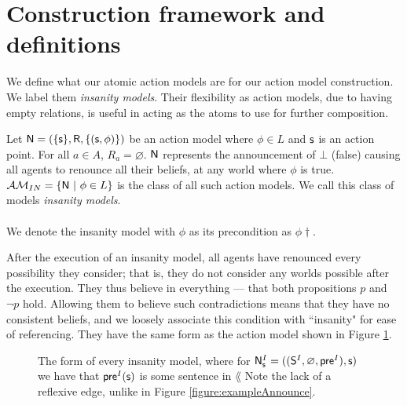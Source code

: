 \section{Construction framework and definitions} \label{subsec:Multi:techPrelim}

We define what our atomic action models are for our action model construction.
We label them {\em insanity models}.
Their flexibility as action models, due to having empty relations, is useful in acting as the atoms to
use for further composition.

\begin{defn} \label{insanity}
Let $\mathrm{\mathsf{\mathrm{\mathsf{N}} = (\{ s \}, R, \{(s, \phi)\})}}$ be an action model
where $\phi \in L$ and $\mathrm{\mathsf{s}}$ is an action point.
For all $a \in A$, $R_a = \varnothing$.
$\mathrm{\mathsf{\mathrm{\mathsf{N}}}}$ represents the announcement of $\bot$ (false) causing all agents to renounce all
their beliefs, at any world where $\phi$ is true.
$\mathcal{AM}_{IN} = \{\mathrm{\mathsf{\mathrm{\mathsf{N}}}} \text{ } | \text{ } \phi \in L\}$ is the class of all such action models.
We call this class of models {\em insanity models}.\\
\\
We denote the insanity model with $\phi$ as its precondition as $\phi \dag$.
\end{defn}

After the execution of an insanity model, all agents have renounced every possibility they consider;
that is, they do not consider any worlds possible after the execution.
They thus believe in everything --- that both propositions $p$ and $\neg p$ hold.
Allowing them to believe such contradictions means that they have no consistent beliefs, and we
loosely associate this condition with ``insanity" for ease of referencing.
They have the same form as the action model shown in Figure \ref{figure:exampleInsane}.

\begin{figure}
\centering
{}
\caption[Insanity action model form]{The form of every insanity model, where for $\mathrm{\mathsf{N}}^I_\mathrm{\mathsf{s}} =
((\mathrm{\mathsf{S}}^I,\varnothing,\mathrm{\mathsf{pre}}^I),\mathrm{\mathsf{s}})$ we have that $\mathrm{\mathsf{pre}}^I(\mathrm{\mathsf{s}})$ is some sentence in $\lang$
Note the lack of a reflexive edge, unlike in Figure \ref{figure:exampleAnnounce}.}
\label{figure:exampleInsane}
\end{figure}

